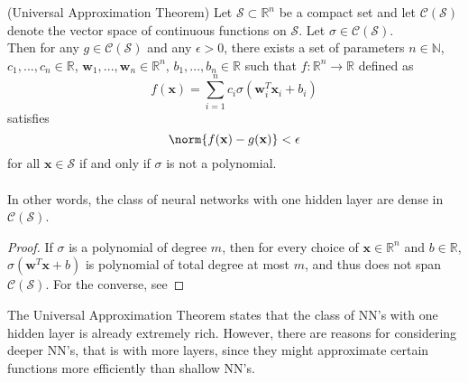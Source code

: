 \begin{tcolorbox}[colback=yellow,colframe=white]
\begin{theorem}{(Universal Approximation Theorem)}
Let $\mathcal{S} \subset \mathbb{R}^n$ be a compact set and let $\mathcal{C}(\mathcal{S})$ denote the vector space of continuous functions on $\mathcal{S}$. Let $\sigma \in \mathcal{C}(\mathcal{S})$. \\
Then for any $g \in \mathcal{C}(\mathcal{S})$ and any $\epsilon > 0$, there exists a set of parameters $n \in \mathbb{N}$, $c_1,...,c_n \in \mathbb{R}$, $\mathbf{w}_1,...,\mathbf{w}_n \in \mathbb{R}^n$, $b_1,...,b_n \in \mathbb{R}$ such that $f:\mathbb{R}^n \rightarrow \mathbb{R}$ defined as 
\begin{equation}
f(\mathbf{x}) = \sum_{i=1}^{n} c_i\sigma(\mathbf{w}^{T}_i\mathbf{x}_i+b_i)
\end{equation}
satisfies
\begin{equation*}
\norm{f(\mathbf{x})-g(\mathbf{x})} < \epsilon
\end{equation*}
for all $\mathbf{x} \in \mathcal{S}$ if and only if $\sigma$ is not a polynomial. 
\\\\In other words, the class of neural networks with one hidden layer are dense in $\mathcal{C}(\mathcal{S})$.
\end{theorem}
\end{tcolorbox}


\begin{proof}
If $\sigma$ is a polynomial of degree $m$, then for every choice of $\mathbf{x} \in \mathbb{R}^n$ and $b \in \mathbb{R}$, $\sigma(\mathbf{w}^{T}\mathbf{x}+b)$ is polynomial of total degree at most $m$, and thus does not span $\mathcal{C}(\mathcal{S})$. For the converse, see 
\end{proof}

The Universal Approximation Theorem states that the class of NN's with one hidden layer is already extremely rich. However, there are reasons for considering deeper NN's, that is with more layers, since they might approximate certain functions more efficiently than shallow NN's.


